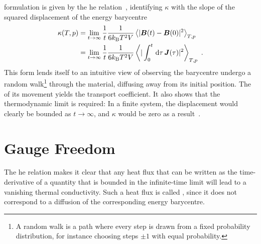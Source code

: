  formulation is given by the \gls{he} relation~\cite{h1960t}, identifying $\kappa$ with the slope of the squared displacement of the energy barycentre
\begin{align}
    \kappa(T, p) 
    &= \lim_{t \rightarrow \infty}
    \frac{1}{t}
    \frac{1}{6 k_{\rm B} T^2 V }
    \left\langle
    \magnitude{\Bary(t) - \Bary(0)}^2
    \right\rangle_{T,p}
    \label{eq:gk_he_bary}
    \\
    &= \lim_{t \rightarrow \infty}
    \frac{1}{t}
    \frac{1}{6 k_{\rm B} T^2 V }
    \left\langle
    \magnitude{
    \int_0^t \,
    \intd \tau\,
    \J (\tau)
    }^2 
    \right\rangle_{T,p}
    ~.
    \label{eq:gk_he_hf}
\end{align}
This form lends itself to an intuitive view of observing the barycentre undergo a random walk\footnote[][-3\baselineskip]{A random walk is a path where every step is drawn from a fixed probability distribution, for instance choosing steps $\pm 1$ with equal probability.} through the material, diffusing away from its initial position. The  of its movement yields the transport coefficient. It also shows that the thermodynamic limit is required: In a finite system, the displacement would clearly be bounded as $t \rightarrow \infty$, and $\kappa$ would be zero as a result~\cite{a1993t,vsg2007At,vsg2007Bt}.

\section{Gauge Freedom}
\label{sec:gk-gauge}
The \gls{he} relation makes it clear that any heat flux that can be written as the time-derivative of a quantity that is bounded in the infinite-time limit will lead to a vanishing thermal conductivity. Such a heat flux is called , since it does not correspond to a diffusion of the corresponding energy barycentre.

